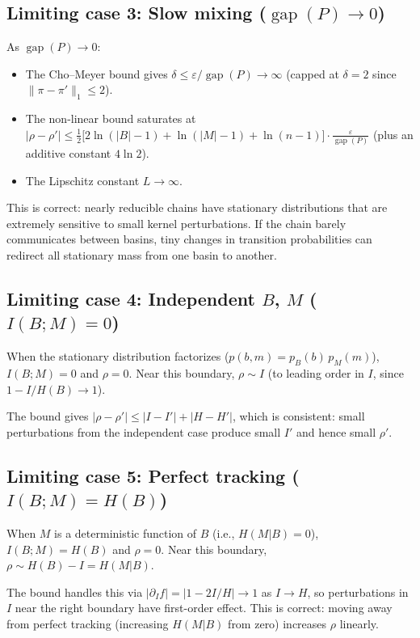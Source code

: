 \documentclass[11pt]{article}
\DeclareMathOperator{\gap}{gap}
\begin{document}
\subsection{Limiting case 3: Slow mixing ($\gap(P) \to 0$)}

As $\gap(P) \to 0$:
\begin{itemize}
  \item The Cho--Meyer bound gives
    $\delta \le \varepsilon/\gap(P) \to \infty$ (capped at $\delta = 2$
    since $\|\pi - \pi'\|_1 \le 2$).
  \item The non-linear bound saturates at
    $|\rho - \rho'| \le \frac{1}{2}\bigl[2\ln(|B|-1) + \ln(|M|-1) + \ln(n-1)\bigr]
    \cdot \frac{\varepsilon}{\gap(P)}$
    (plus an additive constant $4\ln 2$).
  \item The Lipschitz constant $L \to \infty$.
\end{itemize}

This is correct: nearly reducible chains have stationary distributions
that are extremely sensitive to small kernel perturbations.  If the
chain barely communicates between basins, tiny changes in transition
probabilities can redirect all stationary mass from one basin to another.

\subsection{Limiting case 4: Independent $B$, $M$ ($I(B;M) = 0$)}

When the stationary distribution factorizes ($p(b,m) = p_B(b)\,p_M(m)$),
$I(B;M) = 0$ and $\rho = 0$.  Near this boundary, $\rho \sim I$
(to leading order in $I$, since $1 - I/H(B) \to 1$).

The bound gives $|\rho - \rho'| \le |I - I'| + |H - H'|$, which is
consistent: small perturbations from the independent case produce
small $I'$ and hence small $\rho'$.

\subsection{Limiting case 5: Perfect tracking ($I(B;M) = H(B)$)}

When $M$ is a deterministic function of $B$ (i.e., $H(M|B) = 0$),
$I(B;M) = H(B)$ and $\rho = 0$.  Near this boundary,
$\rho \sim H(B) - I = H(M|B)$.

The bound handles this via $|\partial_I f| = |1 - 2I/H| \to 1$ as
$I \to H$, so perturbations in $I$ near the right boundary have
first-order effect.  This is correct: moving away from perfect tracking
(increasing $H(M|B)$ from zero) increases $\rho$ linearly.
\end{document}
